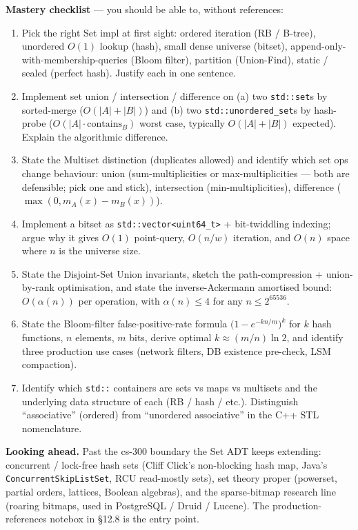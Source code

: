 \documentclass[11pt]{article}
\begin{document}
\begin{ideabox}
\textbf{Mastery checklist} --- you should be able to, without
references:
\begin{enumerate}
    \item Pick the right Set impl at first sight: ordered iteration
          (RB / B-tree), unordered $O(1)$ lookup (hash), small dense
          universe (bitset), append-only-with-membership-queries
          (Bloom filter), partition (Union-Find), static / sealed
          (perfect hash). Justify each in one sentence.
    \item Implement set union / intersection / difference on (a) two
          \texttt{std::set}s by sorted-merge ($O(|A|+|B|)$) and
          (b) two \texttt{std::unordered\_set}s by hash-probe
          ($O(|A| \cdot \text{contains}_B)$ worst case, typically
          $O(|A|+|B|)$ expected). Explain the algorithmic difference.
    \item State the Multiset distinction (duplicates allowed) and
          identify which set ops change behaviour: union
          (sum-multiplicities or max-multiplicities --- both are
          defensible; pick one and stick), intersection
          (min-multiplicities), difference
          ($\max(0, m_A(x) - m_B(x))$).
    \item Implement a bitset as \texttt{std::vector<uint64\_t>} +
          bit-twiddling indexing; argue why it gives $O(1)$
          point-query, $O(n / w)$ iteration, and $O(n)$ space where
          $n$ is the universe size.
    \item State the Disjoint-Set Union invariants, sketch the
          path-compression + union-by-rank optimisation, and state
          the inverse-Ackermann amortised bound: $O(\alpha(n))$ per
          operation, with $\alpha(n) \le 4$ for any $n \le 2^{65536}$.
    \item State the Bloom-filter false-positive-rate formula
          $\bigl(1 - e^{-kn/m}\bigr)^k$ for $k$ hash functions, $n$
          elements, $m$ bits, derive optimal
          $k \approx (m/n) \ln 2$, and identify three production use
          cases (network filters, DB existence pre-check, LSM
          compaction).
    \item Identify which \texttt{std::} containers are sets vs maps
          vs multisets and the underlying data structure of each
          (RB / hash / etc.). Distinguish ``associative'' (ordered)
          from ``unordered associative'' in the C++ STL nomenclature.
\end{enumerate}

\textbf{Looking ahead.} Past the cs-300 boundary the Set ADT keeps
extending: concurrent / lock-free hash sets (Cliff Click's
non-blocking hash map, Java's \texttt{ConcurrentSkipListSet}, RCU
read-mostly sets), set theory proper (powerset, partial orders,
lattices, Boolean algebras), and the sparse-bitmap research line
(roaring bitmaps, used in PostgreSQL / Druid / Lucene). The
production-references notebox in \S12.8 is the entry point.
\end{ideabox}
\end{document}
